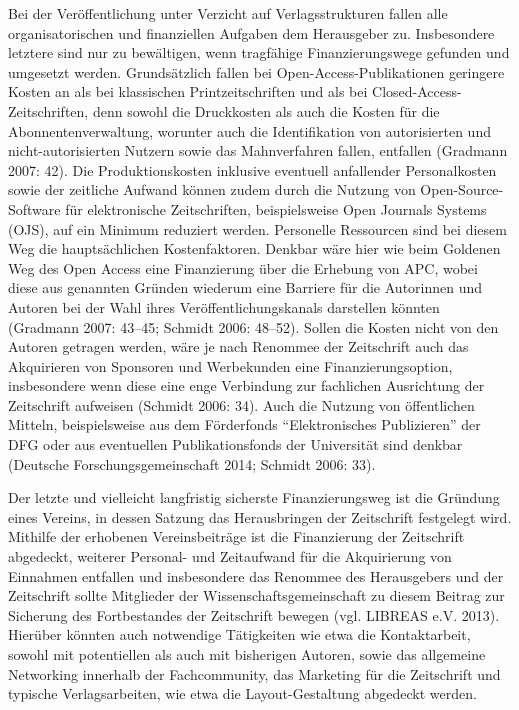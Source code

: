 \documentclass[a4paper,
fontsize=11pt,
oneside,
numbers=noperiodatend,
parskip=half-,
bibliography=totoc,
final
]{scrartcl}
\begin{document}
Bei der Veröffentlichung unter Verzicht auf Verlagsstrukturen fallen
alle organisatorischen und finanziellen Aufgaben dem Herausgeber zu.
Insbesondere letztere sind nur zu bewältigen, wenn tragfähige
Finanzierungswege gefunden und umgesetzt werden. Grundsätzlich fallen
bei Open-Access-Publikationen geringere Kosten an als bei klassischen
Printzeitschriften und als bei Closed-Access-Zeitschriften, denn sowohl
die Druckkosten als auch die Kosten für die Abonnentenverwaltung,
worunter auch die Identifikation von autorisierten und
nicht-autorisierten Nutzern sowie das Mahnverfahren fallen, entfallen
(Gradmann 2007: 42). Die Produktionskosten inklusive eventuell
anfallender Personalkosten sowie der zeitliche Aufwand können zudem
durch die Nutzung von Open-Source-Software für elektronische
Zeitschriften, beispielsweise Open Journals Systems (OJS), auf ein
Minimum reduziert werden. Personelle Ressourcen sind bei diesem Weg die
hauptsächlichen Kostenfaktoren. Denkbar wäre hier wie beim Goldenen Weg
des Open Access eine Finanzierung über die Erhebung von APC, wobei diese
aus genannten Gründen wiederum eine Barriere für die Autorinnen und
Autoren bei der Wahl ihres Veröffentlichungskanals darstellen könnten
(Gradmann 2007: 43--45; Schmidt 2006: 48--52). Sollen die Kosten nicht
von den Autoren getragen werden, wäre je nach Renommee der Zeitschrift
auch das Akquirieren von Sponsoren und Werbekunden eine
Finanzierungsoption, insbesondere wenn diese eine enge Verbindung zur
fachlichen Ausrichtung der Zeitschrift aufweisen (Schmidt 2006: 34).
Auch die Nutzung von öffentlichen Mitteln, beispielsweise aus dem
Förderfonds \enquote{Elektronisches Publizieren} der DFG oder aus
eventuellen Publikationsfonds der Universität sind denkbar (Deutsche
Forschungsgemeinschaft 2014; Schmidt 2006: 33).

Der letzte und vielleicht langfristig sicherste Finanzierungsweg ist die
Gründung eines Vereins, in dessen Satzung das Herausbringen der
Zeitschrift festgelegt wird. Mithilfe der erhobenen Vereinsbeiträge ist
die Finanzierung der Zeitschrift abgedeckt, weiterer Personal- und
Zeitaufwand für die Akquirierung von Einnahmen entfallen und
insbesondere das Renommee des Herausgebers und der Zeitschrift sollte
Mitglieder der Wissenschaftsgemeinschaft zu diesem Beitrag zur Sicherung
des Fortbestandes der Zeitschrift bewegen (vgl. LIBREAS e.V. 2013).
Hierüber könnten auch notwendige Tätigkeiten wie etwa die Kontaktarbeit,
sowohl mit potentiellen als auch mit bisherigen Autoren, sowie das
allgemeine Networking innerhalb der Fachcommunity, das Marketing für die
Zeitschrift und typische Verlagsarbeiten, wie etwa die Layout-Gestaltung
abgedeckt werden.
\end{document}
